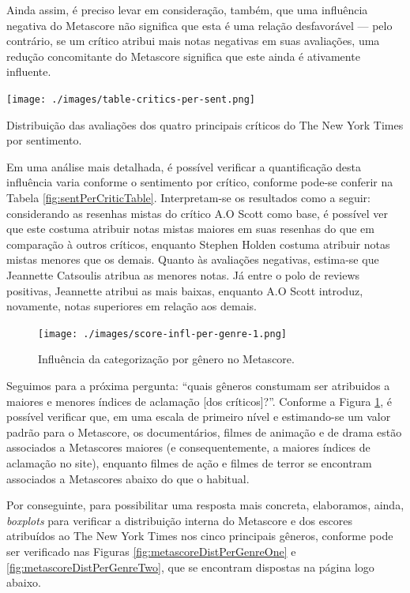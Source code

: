 \documentclass[review]{elsarticle}
\begin{document}
Ainda assim, é preciso levar em consideração, também, que uma influência negativa do Metascore não significa que esta é uma relação desfavorável — pelo contrário, se um crítico atribui mais notas negativas em suas avaliações, uma redução concomitante do Metascore significa que este ainda é ativamente influente.

\begin{table}[!h]
  \centering
  \texttt{[image: ./images/table-critics-per-sent.png]}
  \caption{Distribuição das avaliações dos quatro principais críticos do The New York Times por sentimento.}
  \label{fig:sentPerCriticTable}
\end{table}

Em uma análise mais detalhada, é possível verificar a quantificação desta influência varia conforme o sentimento por crítico, conforme pode-se conferir na Tabela \ref{fig:sentPerCriticTable}. Interpretam-se os resultados como a seguir: considerando as resenhas mistas do crítico A.O Scott como base, é possível ver que este costuma atribuir notas mistas maiores em suas resenhas do que em comparação à outros críticos, enquanto Stephen Holden costuma atribuir notas mistas menores que os demais. Quanto às avaliações negativas, estima-se que Jeannette Catsoulis atribua as menores notas. Já entre o polo de reviews positivas, Jeannette atribui as mais baixas, enquanto A.O Scott introduz, novamente, notas superiores em relação aos demais. 

\begin{figure}[!h]
  \centering
  \texttt{[image: ./images/score-infl-per-genre-1.png]}
  \caption{Influência da categorização por gênero no Metascore.}
  \label{fig:metascoreInflPerGenre}
\end{figure}

Seguimos para a próxima pergunta: “quais gêneros constumam ser atribuidos a maiores e menores índices de aclamação [dos críticos]?”. Conforme a Figura \ref{fig:metascoreInflPerGenre}, é possível verificar que, em uma escala de primeiro nível e estimando-se um valor padrão para o Metascore, os documentários, filmes de animação e de drama estão associados a Metascores maiores (e consequentemente, a maiores índices de aclamação no site), enquanto filmes de ação e filmes de terror se encontram associados a Metascores abaixo do que o habitual. 

Por conseguinte, para possibilitar uma resposta mais concreta, elaboramos, ainda, \textit{boxplots} para verificar a distribuição interna do Metascore e dos escores atribuídos ao The New York Times nos cinco principais gêneros, conforme pode ser verificado nas Figuras \ref{fig:metascoreDistPerGenreOne} e \ref{fig:metascoreDistPerGenreTwo}, que se encontram dispostas na página logo abaixo.
\end{document}
